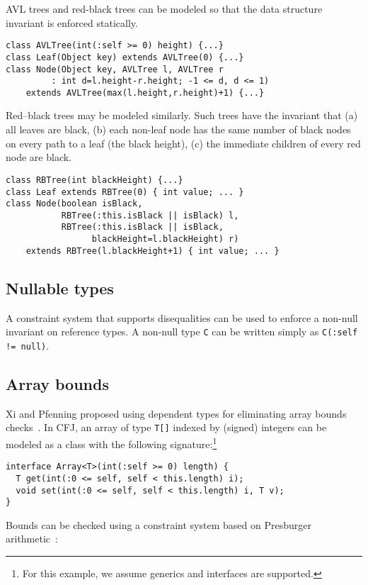 AVL trees and red-black trees can be modeled so that the
data structure invariant is enforced statically.

{\footnotesize
\begin{verbatim}
class AVLTree(int(:self >= 0) height) {...}
class Leaf(Object key) extends AVLTree(0) {...}
class Node(Object key, AVLTree l, AVLTree r
         : int d=l.height-r.height; -1 <= d, d <= 1) 
    extends AVLTree(max(l.height,r.height)+1) {...}
\end{verbatim}}

Red--black trees may be modeled similarly. Such trees have the
invariant that (a) all leaves are black, (b) each non-leaf node has
the same number of black nodes on every path to a leaf (the black
height), (c) the immediate children of every red node are black.
{\footnotesize
\begin{verbatim}
class RBTree(int blackHeight) {...}
class Leaf extends RBTree(0) { int value; ... }
class Node(boolean isBlack, 
           RBTree(:this.isBlack || isBlack) l, 
           RBTree(:this.isBlack || isBlack,
                 blackHeight=l.blackHeight) r)
    extends RBTree(l.blackHeight+1) { int value; ... }
\end{verbatim}}

\subsection{Nullable types}

A constraint system that supports disequalities can be used to
enforce a non-null invariant on reference types.
A non-null type {\tt C} can be written simply as {\tt C(:self != null)}.

\subsection{Array bounds}

Xi and Pfenning proposed using dependent types for eliminating
array bounds checks~\cite{xi98array}.
In CFJ, an array of type {\tt T[]} indexed by (signed) integers
can be modeled as a class with the following
signature:\footnote{For this example, we assume generics and
interfaces are supported.}
\begin{verbatim}
interface Array<T>(int(:self >= 0) length) {
  T get(int(:0 <= self, self < this.length) i);
  void set(int(:0 <= self, self < this.length) i, T v);
}
\end{verbatim}

Bounds can be checked using a constraint system based on
Presburger arithmetic~\cite{omega}:

